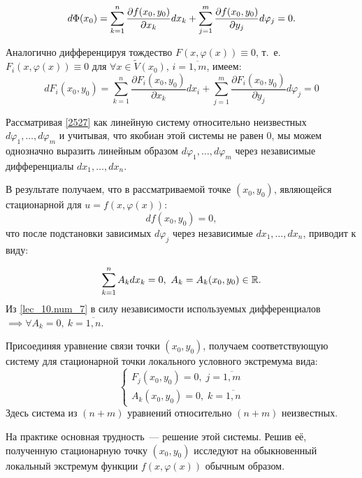 \documentclass[../../main.tex]{subfiles}
\begin{document}
\begin{equation} \label{lec_10.num_6}
	d\Phi(x_0) = \sum_{k = 1}^{n} \frac{\partial  f(x_0, y_0) }{\partial x_k} 
	dx_k + \sum_{j = 1}^{m} \frac{\partial  f(x_0, y_0) }{\partial y_j} d\varphi_j = 0.
\end{equation}

Аналогично дифференцируя тождество $F(x, \varphi(x)) \equiv 0$, т.~е. $F_i(x, 
\varphi(x)) \equiv 0$ для ${\forall x \in \widetilde{V}(x_0)}$, $i = 
\overline{1, m}$, имеем:
\begin{equation}
\label{2527}
d F_i (x_0, y_0) = \sum\limits_{k=1}^{n} \dfrac{\partial F_i (x_0, 
y_0)}{\partial x_k} d x_i + \sum\limits_{j=1}^{m} \dfrac{\partial F_i (x_0, 
y_0)}{\partial y_j} d \varphi_j = 0
\end{equation}

Рассматривая \eqref{2527} как линейную систему относительно неизвестных
$d\varphi_1, \ldots, d\varphi_m$ и учитывая, что якобиан 
этой системы не равен $0$,
мы можем однозначно выразить линейным образом $d\varphi_1, \dots, d\varphi_m$
через независимые дифференциалы $dx_1, \ldots, dx_n$.

В результате получаем, что в рассматриваемой точке $(x_0, y_0)$,
являющейся стационарной для $u = f\left( x, \varphi(x) \right)$:
\[ df(x_0, y_0) = 0, \]
что после подстановки зависимых $d\varphi_j$ через независимые 
$dx_1, \ldots, dx_n$, приводит к виду:

\begin{equation} \label{lec_10.num_7}
	\sum_{k = 1}^{n} A_k dx_k = 0,\ A_k = A_k(x_0, y_0) \in \mathbb{R}.
\end{equation}
Из \eqref{lec_10.num_7} в силу независимости используемых дифференциалов 
$\implies \forall A_k = 0,\ k = \overline{1, n}$.

Присоединяя уравнение связи точки $(x_0, y_0)$, получаем 
соответствующую систему для стационарной точки локального 
условного экстремума вида:
\[ \begin{cases}
	F_j(x_0, y_0) = 0, \; j = \overline{1, m} \\
	A_k(x_0, y_0) = 0, \; k = \overline{1, n}
\end{cases} \]
Здесь система из $(n+m)$ уравнений относительно $(n+m)$ неизвестных.

На практике основная трудность~--- решение этой системы.
Решив её, полученную стационарную точку $(x_0, y_0)$ исследуют
на обыкновенный локальный экстремум функции $f(x, \varphi(x))$ обычным образом.
\end{document}

